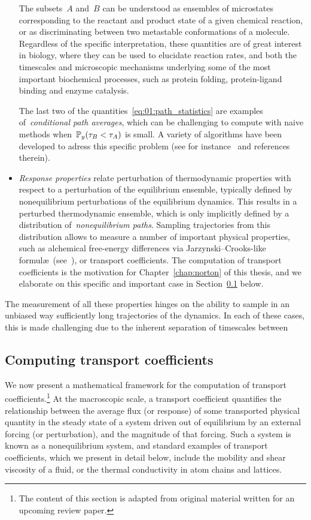 \begin{itemize}
{        The subsets~$A$ and~$B$ can be understood as ensembles of microstates corresponding to the reactant and product state of a given chemical reaction, or as discriminating between two metastable conformations of a molecule.
        Regardless of the specific interpretation, these quantities are of great interest in biology, where they can be used to elucidate reaction rates, and both the timescales and microscopic mechanisms underlying some of the most important biochemical processes, such as protein folding, protein-ligand binding and enzyme catalysis.

        The last two of the quantities~\eqref{eq:01:path_statistics} are examples of~\textit{conditional path averages}, which can be challenging to compute with naive methods when~$\P_y(\tau_B<\tau_A)$ is small. A variety of algorithms have been developed to adress this specific problem (see for instance~\cite{DBG02,AVTW09,CGR19} and references therein).
    }
    
    \item{\textit{Response properties} relate perturbation of thermodynamic properties with respect to a perturbation of the equilibrium ensemble, typically defined by nonequilibrium perturbations of the equilibrium dynamics.
    This results in a perturbed thermodynamic ensemble, which is only implicitly defined by a distribution of~\textit{nonequilibrium paths}. Sampling trajectories from this distribution allows to measure a number of important physical properties, such as alchemical free-energy differences via Jarzynski--Crooks-like formul\ae~(see~\cite[Chapter 4]{LRS10}), or transport coefficients.
    The computation of transport coefficients is the motivation for Chapter~\ref{chap:norton} of this thesis, and we elaborate on this specific and important case in Section~\ref{sec:01:transport_coefficients} below.
    }
\end{itemize}

The measurement of all these properties hinges on the ability to sample in an unbiased way sufficiently long trajectories of the dynamics.
In each of these cases, this is made challenging due to the inherent separation of timescales between 

\subsection{Computing transport coefficients}
\label{sec:01:transport_coefficients}
We now present a mathematical framework for the computation of transport coefficients.\footnote{The content of this section is adapted from original material written for an upcoming review paper.} At the macroscopic scale, a transport coefficient quantifies the relationship between the average flux (or response) of some transported physical quantity in the steady state of a system driven out of equilibrium by an external forcing (or perturbation), and the magnitude of that forcing.
Such a system is known as a nonequilibrium system, and standard examples of transport coefficients, which we present in detail below, include the mobility and shear viscosity of a fluid, or the thermal conductivity in atom chains and lattices.


